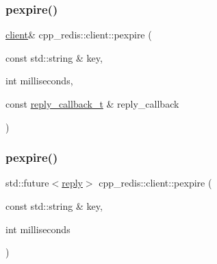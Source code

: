 \mbox{\label{classcpp__redis_1_1client_a8fc29a500492504985a714d9aaed8963}} 
\subsubsection{\texorpdfstring{pexpire()}{pexpire()}\hspace{0.1cm}{\footnotesize\ttfamily [1/2]}}
{\footnotesize\ttfamily \hyperlink{classcpp__redis_1_1client}{client}\& cpp\+\_\+redis\+::client\+::pexpire (\begin{DoxyParamCaption}\item[{const std\+::string \&}]{key,  }\item[{int}]{milliseconds,  }\item[{const \hyperlink{classcpp__redis_1_1client_a061a1140d36d2eaeda82b09a0bb3f9f2}{reply\+\_\+callback\+\_\+t} \&}]{reply\+\_\+callback }\end{DoxyParamCaption})}

\mbox{\label{classcpp__redis_1_1client_aa0974d486cae342eced35d64c6e68d40}} 
\subsubsection{\texorpdfstring{pexpire()}{pexpire()}\hspace{0.1cm}{\footnotesize\ttfamily [2/2]}}
{\footnotesize\ttfamily std\+::future$<$\hyperlink{classcpp__redis_1_1reply}{reply}$>$ cpp\+\_\+redis\+::client\+::pexpire (\begin{DoxyParamCaption}\item[{const std\+::string \&}]{key,  }\item[{int}]{milliseconds }\end{DoxyParamCaption})}

\mbox{\label{classcpp__redis_1_1client_a7c872e32ed28a78515c1711e4cafbabf}} 
